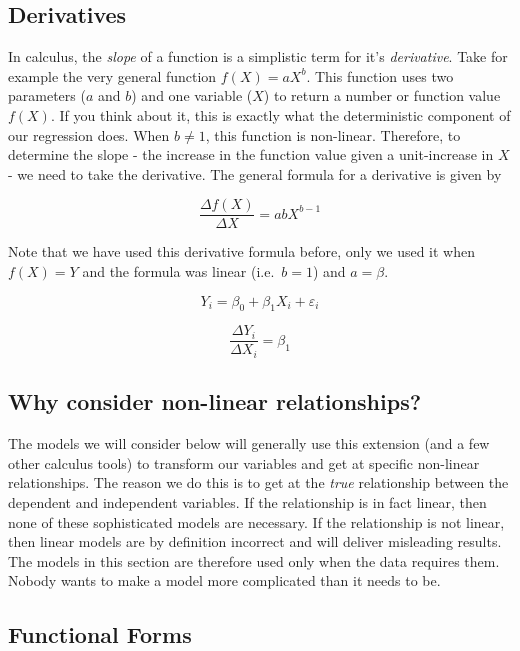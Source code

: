 \documentclass[
]{book}
\begin{document}
\hypertarget{derivatives}{%
\subsection{Derivatives}\label{derivatives}}

In calculus, the \emph{slope} of a function is a simplistic term for it's \emph{derivative}. Take for example the very general function \(f(X) = aX^b\). This function uses two parameters (\(a\) and \(b\)) and one variable (\(X\)) to return a number or function value \(f(X)\). If you think about it, this is exactly what the deterministic component of our regression does. When \(b\neq1\), this function is non-linear. Therefore, to determine the slope - the increase in the function value given a unit-increase in \(X\) - we need to take the derivative. The general formula for a derivative is given by

\[\frac{\Delta f(X)}{\Delta X}=abX^{b-1}\]

Note that we have used this derivative formula before, only we used it when \(f(X)=Y\) and the formula was linear (i.e.~\(b=1\)) and \(a = \beta\).

\[Y_i = \beta_0 + \beta_1 X_i + \varepsilon_i\]

\[\frac{\Delta Y_i}{\Delta X_i}=\beta_1\]

\hypertarget{why-consider-non-linear-relationships}{%
\subsection{Why consider non-linear relationships?}\label{why-consider-non-linear-relationships}}

The models we will consider below will generally use this extension (and a few other calculus tools) to transform our variables and get at specific non-linear relationships. The reason we do this is to get at the \emph{true} relationship between the dependent and independent variables. If the relationship is in fact linear, then none of these sophisticated models are necessary. If the relationship is not linear, then linear models are by definition incorrect and will deliver misleading results. The models in this section are therefore used only when the data requires them. Nobody wants to make a model more complicated than it needs to be.

\hypertarget{functional-forms}{%
\subsection{Functional Forms}\label{functional-forms}}
\end{document}
